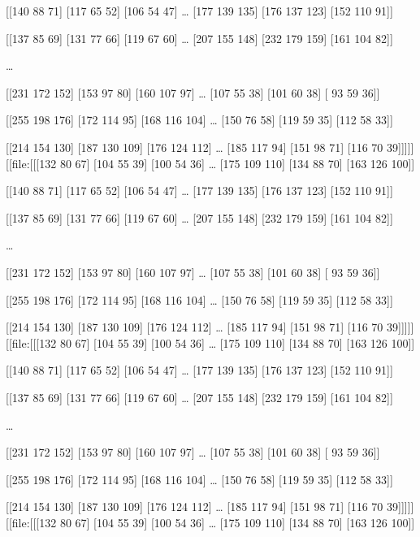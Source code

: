 \documentclass[letterpaper, 11pt]{article}
\begin{document}
[[140  88  71]
 [117  65  52]
 [106  54  47]
 \ldots{}
 [177 139 135]
 [176 137 123]
 [152 110  91]]

[[137  85  69]
 [131  77  66]
 [119  67  60]
 \ldots{}
 [207 155 148]
 [232 179 159]
 [161 104  82]]

\ldots{}

[[231 172 152]
 [153  97  80]
 [160 107  97]
 \ldots{}
 [107  55  38]
 [101  60  38]
 [ 93  59  36]]

[[255 198 176]
 [172 114  95]
 [168 116 104]
 \ldots{}
 [150  76  58]
 [119  59  35]
 [112  58  33]]

 [[214 154 130]
  [187 130 109]
  [176 124 112]
  \ldots{}
  [185 117  94]
  [151  98  71]
  [116  70  39]]]]]
[[file:[[[132  80  67]
  [104  55  39]
  [100  54  36]
  \ldots{}
  [175 109 110]
  [134  88  70]
  [163 126 100]]

[[140  88  71]
 [117  65  52]
 [106  54  47]
 \ldots{}
 [177 139 135]
 [176 137 123]
 [152 110  91]]

[[137  85  69]
 [131  77  66]
 [119  67  60]
 \ldots{}
 [207 155 148]
 [232 179 159]
 [161 104  82]]

\ldots{}

[[231 172 152]
 [153  97  80]
 [160 107  97]
 \ldots{}
 [107  55  38]
 [101  60  38]
 [ 93  59  36]]

[[255 198 176]
 [172 114  95]
 [168 116 104]
 \ldots{}
 [150  76  58]
 [119  59  35]
 [112  58  33]]

 [[214 154 130]
  [187 130 109]
  [176 124 112]
  \ldots{}
  [185 117  94]
  [151  98  71]
  [116  70  39]]]]]
[[file:[[[132  80  67]
  [104  55  39]
  [100  54  36]
  \ldots{}
  [175 109 110]
  [134  88  70]
  [163 126 100]]

[[140  88  71]
 [117  65  52]
 [106  54  47]
 \ldots{}
 [177 139 135]
 [176 137 123]
 [152 110  91]]

[[137  85  69]
 [131  77  66]
 [119  67  60]
 \ldots{}
 [207 155 148]
 [232 179 159]
 [161 104  82]]

\ldots{}

[[231 172 152]
 [153  97  80]
 [160 107  97]
 \ldots{}
 [107  55  38]
 [101  60  38]
 [ 93  59  36]]

[[255 198 176]
 [172 114  95]
 [168 116 104]
 \ldots{}
 [150  76  58]
 [119  59  35]
 [112  58  33]]

 [[214 154 130]
  [187 130 109]
  [176 124 112]
  \ldots{}
  [185 117  94]
  [151  98  71]
  [116  70  39]]]]]
[[file:[[[132  80  67]
  [104  55  39]
  [100  54  36]
  \ldots{}
  [175 109 110]
  [134  88  70]
  [163 126 100]]
\end{document}
